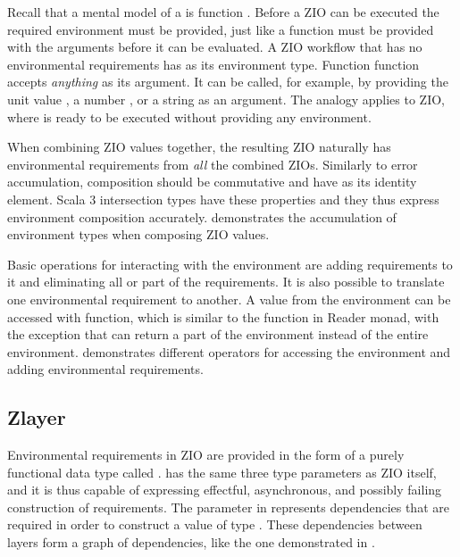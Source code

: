 Recall that a mental model of a  is function . Before a ZIO can be executed the required environment must be provided, just like a function must be provided with the arguments before it can be evaluated. A ZIO workflow that has no environmental requirements has  as its environment type. Function  function accepts \textit{anything} as its argument. It can be called, for example, by providing the unit value , a number , or a string  as an argument. The analogy applies to ZIO, where  is ready to be executed without providing any environment.



When combining ZIO values together, the resulting ZIO naturally has environmental requirements from \emph{all} the combined ZIOs. Similarly to error accumulation, composition should be commutative and have  as its identity element. Scala 3 intersection types have these properties and they thus express environment composition accurately.  demonstrates the accumulation of environment types when composing ZIO values.

Basic operations for interacting with the environment are adding requirements to it and eliminating all or part of the requirements. It is also possible to translate one environmental requirement to another. A value from the environment can be accessed with  function, which is similar to the  function in Reader monad, with the exception that  can return a part of the environment instead of the entire environment.  demonstrates different operators for accessing the environment and adding environmental requirements.




\subsection{Zlayer}
Environmental requirements in ZIO are provided in the form of a purely functional data type called .  has the same three type parameters as ZIO itself, and it is thus capable of expressing effectful, asynchronous, and possibly failing construction of requirements. The  parameter in  represents dependencies that are required in order to construct a value of type . These dependencies between layers form a graph of dependencies, like the one demonstrated in .

